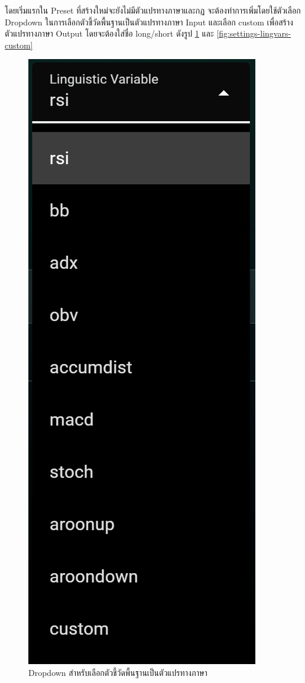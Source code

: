 \FloatBarrier
โดยเริ่มแรกใน Preset ที่สร้างใหม่จะยังไม่มีตัวแปรทางภาษาและกฏ จะต้องทำการเพิ่มโดยใช้ตัวเลือก Dropdown ในการเลือกตัวชี้วัดพื้นฐานเป็นตัวแปรทางภาษา Input และเลือก custom เพื่อสร้างตัวแปรทางภาษา Output โดยจะต้องใส่ชื่อ long/short ดังรูป \ref{fig:settings-lingvars-dd} และ \ref{fig:settings-lingvars-custom}
\begin{figure}[ht]
    \centering
    \includegraphics[scale=0.5]{images/web-tuts/settings-lingvars-dd.PNG}
    \caption{Dropdown สำหรับเลือกตัวชี้วัดพื้นฐานเป็นตัวแปรทางภาษา}
    \label{fig:settings-lingvars-dd}
\end{figure}
